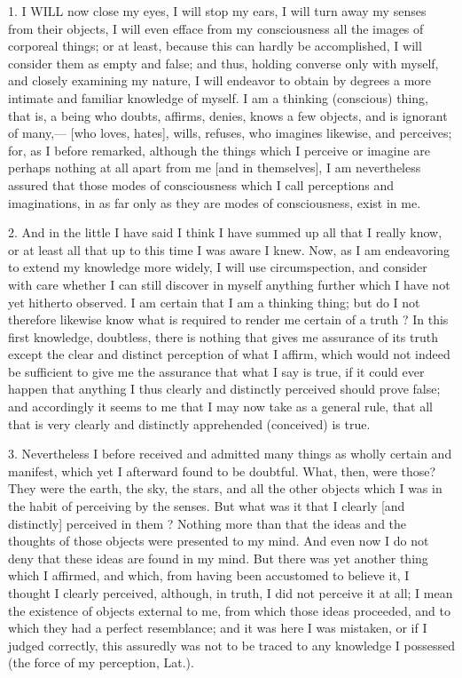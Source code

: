1. I WILL now close my eyes, I will stop my ears, I will turn away my senses from their objects, I will even efface from my consciousness all the images of corporeal things; or at least, because this can hardly be accomplished, I will consider them as empty and false; and thus, holding converse only with myself, and closely examining my nature, I will endeavor to obtain by degrees a more intimate and familiar knowledge of myself. I am a thinking (conscious) thing, that is, a being who doubts, affirms, denies, knows a few objects, and is ignorant of many,— [who loves, hates], wills, refuses, who imagines likewise, and perceives; for, as I before remarked, although the things which I perceive or imagine are perhaps nothing at all apart from me [and in themselves], I am nevertheless assured that those modes of consciousness which I call perceptions and imaginations, in as far only as they are modes of consciousness, exist in me.

2. And in the little I have said I think I have summed up all that I really know, or at least all that up to this time I was aware I knew. Now, as I am endeavoring to extend my knowledge more widely, I will use circumspection, and consider with care whether I can still discover in myself anything further which I have not yet hitherto observed. I am certain that I am a thinking thing; but do I not therefore likewise know what is required to render me certain of a truth ? In this first knowledge, doubtless, there is nothing that gives me assurance of its truth except the clear and distinct perception of what I affirm, which would not indeed be sufficient to give me the assurance that what I say is true, if it could ever happen that anything I thus clearly and distinctly perceived should prove false; and accordingly it seems to me that I may now take as a general rule, that all that is very clearly and distinctly apprehended (conceived) is true.

3. Nevertheless I before received and admitted many things as wholly certain and manifest, which yet I afterward found to be doubtful. What, then, were those? They were the earth, the sky, the stars, and all the other objects which I was in the habit of perceiving by the senses. But what was it that I clearly [and distinctly] perceived in them ? Nothing more than that the ideas and the thoughts of those objects were presented to my mind. And even now I do not deny that these ideas are found in my mind. But there was yet another thing which I affirmed, and which, from having been accustomed to believe it, I thought I clearly perceived, although, in truth, I did not perceive it at all; I mean the existence of objects external to me, from which those ideas proceeded, and to which they had a perfect resemblance; and it was here I was mistaken, or if I judged correctly, this assuredly was not to be traced to any knowledge I possessed (the force of my perception, Lat.).

